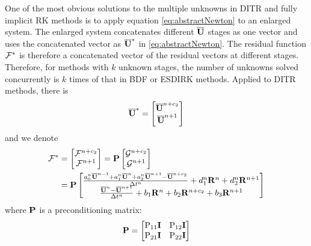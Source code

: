 \documentclass[preprint,12pt]{elsarticle}
\begin{document}
One of the most obvious solutions to the multiple unknowns
in DITR and fully implicit RK methods is to apply
equation \eqref{eq:abstractNewton} to an enlarged
system.
The enlarged system concatenates different $\overline{\mathbf{U}}$
stages as one vector and uses the concatenated vector as
$\overline{\mathbf{U}}^*$ in \eqref{eq:abstractNewton}.
The residual function $\mathcal{F}^*$ is therefore a concatenated vector of
the residual vectors at different stages.
Therefore, for methods with $k$ unknown stages, the number of
unknowns solved concurrently is $k$ times of that in BDF or ESDIRK methods.
Applied to DITR methods, there is
\begin{equation}
    \overline{\mathbf{U}}^* = \begin{bmatrix}
        \overline{\mathbf{U}}^{n+c_2} \\
        \overline{\mathbf{U}}^{n+1}
    \end{bmatrix}
\end{equation}
and we denote
\newcommand{\GG}{\mathcal{G}}
\begin{equation}
    \begin{aligned}
        \FF^* & =\begin{bmatrix}
                     \FF^{n+c_2} \\
                     \FF^{n+1}
                 \end{bmatrix} = \Pm\begin{bmatrix}
                                        \GG^{n+c_2} \\
                                        \GG^{n+1}
                                    \end{bmatrix} \\ & = \Pm\begin{bmatrix}
            \frac{a^n_0\uu^{n - 1} +
                a^n_1\uu^{n} +
                a^n_2\uu^{n + 1} - \uu^{n+c_2}}{\inc t^n}
            +
            d^n_1\R^{n} +
            d^n_2\R^{n + 1}
            \\
            \frac{\uu^{n} - \uu^{n+1}}{\inc t^n}  +
            b_1 \R^n +
            b_2 \R^{n+c_2} +
            b_3 \R^{n+1}
        \end{bmatrix}
        \label{eq:DITRFFDef}
    \end{aligned}
\end{equation}
where $\mathbf{P}$ is a preconditioning matrix:
\begin{equation}
    \mathbf{P} = \begin{bmatrix}
        \mathrm{P}_{11}\mathbf{I} & \mathrm{P}_{12}\mathbf{I} \\
        \mathrm{P}_{21}\mathbf{I} & \mathrm{P}_{22}\mathbf{I} \\
    \end{bmatrix}
\end{equation}
\end{document}
